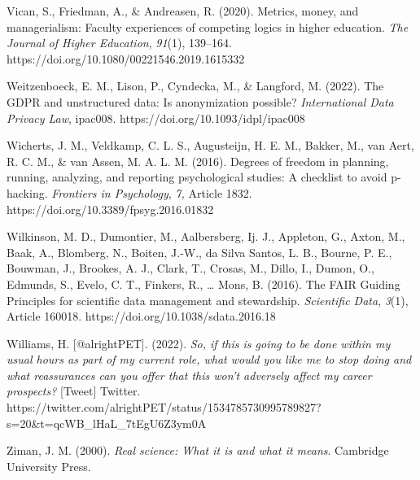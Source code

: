 \documentclass[meta, authordate]{jote-new-article}
\begin{document}
Vican, S., Friedman, A., & Andreasen, R. (2020). Metrics, money, and managerialism: Faculty experiences of competing logics in higher education. \emph{The Journal of Higher Education}, \emph{91}(1), 139–164. https://doi.org/10.1080/00221546.2019.1615332



Weitzenboeck, E. M., Lison, P., Cyndecka, M., & Langford, M. (2022). The GDPR and unstructured data: Is anonymization possible? \emph{International Data Privacy Law}, ipac008. https://doi.org/10.1093/idpl/ipac008



Wicherts, J. M., Veldkamp, C. L. S., Augusteijn, H. E. M., Bakker, M., van Aert, R. C. M., & van Assen, M. A. L. M. (2016). Degrees of freedom in planning, running, analyzing, and reporting psychological studies: A checklist to avoid p-hacking. \emph{Frontiers in Psychology}, \emph{7, }Article 1832. https://doi.org/10.3389/fpsyg.2016.01832



Wilkinson, M. D., Dumontier, M., Aalbersberg, Ij. J., Appleton, G., Axton, M., Baak, A., Blomberg, N., Boiten, J.-W., da Silva Santos, L. B., Bourne, P. E., Bouwman, J., Brookes, A. J., Clark, T., Crosas, M., Dillo, I., Dumon, O., Edmunds, S., Evelo, C. T., Finkers, R., … Mons, B. (2016). The FAIR Guiding Principles for scientific data management and stewardship. \emph{Scientific Data}, \emph{3}(1), Article 160018. https://doi.org/10.1038/sdata.2016.18



Williams, H. [@alrightPET]. (2022). \emph{So, if this is going to be done within my usual hours as part of my current role, what would you like me to stop doing and what reassurances can you offer that this won’t adversely affect my career prospects?} [Tweet] Twitter. https://twitter.com/alrightPET/status/1534785730995789827?s=20&t=qcWB_lHaL_7tEgU6Z3ym0A



Ziman, J. M. (2000). \emph{Real science: What it is and what it means}. Cambridge University Press.
\end{document}
